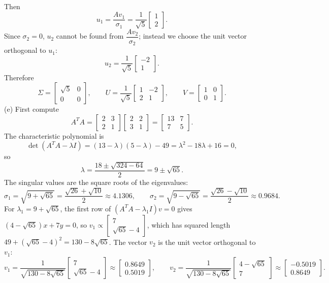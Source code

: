 \documentclass[11pt]{article}
\begin{document}
Then
$$
u_1 = \dfrac{Av_1}{\sigma_1} = \dfrac{1}{\sqrt{5}}\begin{bmatrix} 1 \\ 2 \end{bmatrix}.
$$
Since $\sigma_2 = 0$, $u_2$ cannot be found from $\dfrac{Av_2}{\sigma_2}$; instead we choose
the unit vector orthogonal to $u_1$:
$$
u_2 = \dfrac{1}{\sqrt{5}}\begin{bmatrix} -2 \\ 1 \end{bmatrix}.
$$
Therefore
$$
\Sigma = \begin{bmatrix} \sqrt{5} & 0 \\ 0 & 0 \end{bmatrix}, \qquad
U = \dfrac{1}{\sqrt{5}}\begin{bmatrix} 1 & -2 \\ 2 & 1 \end{bmatrix}, \qquad
V = \begin{bmatrix} 1 & 0 \\ 0 & 1 \end{bmatrix}.
$$
\bigskip
(e)
First compute
$$
A^TA = \begin{bmatrix} 2 & 3 \\ 2 & 1 \end{bmatrix}
\begin{bmatrix} 2 & 2 \\ 3 & 1 \end{bmatrix}
= \begin{bmatrix} 13 & 7 \\ 7 & 5 \end{bmatrix}.
$$
The characteristic polynomial is
$$
\det(A^TA - \lambda I) = (13 - \lambda)(5 - \lambda) - 49 = \lambda^2 - 18\lambda + 16 = 0,
$$
so
$$
\lambda = \dfrac{18 \pm \sqrt{324 - 64}}{2} = 9 \pm \sqrt{65}.
$$
The singular values are the square roots of the eigenvalues:
$$
\sigma_1 = \sqrt{9 + \sqrt{65}} = \dfrac{\sqrt{26} + \sqrt{10}}{2} \approx 4.1306, \qquad
\sigma_2 = \sqrt{9 - \sqrt{65}} = \dfrac{\sqrt{26} - \sqrt{10}}{2} \approx 0.9684.
$$
For $\lambda_1 = 9 + \sqrt{65}$, the first row of $(A^TA - \lambda_1 I)v = 0$ gives
$(4 - \sqrt{65})x + 7y = 0$, so $v_1 \propto \begin{bmatrix} 7 \\ \sqrt{65} - 4 \end{bmatrix}$,
which has squared length $49 + (\sqrt{65} - 4)^2 = 130 - 8\sqrt{65}$. The vector $v_2$ is the
unit vector orthogonal to $v_1$:
$$
v_1 = \dfrac{1}{\sqrt{130 - 8\sqrt{65}}}\begin{bmatrix} 7 \\ \sqrt{65} - 4 \end{bmatrix}
\approx \begin{bmatrix} 0.8649 \\ 0.5019 \end{bmatrix}, \qquad
v_2 = \dfrac{1}{\sqrt{130 - 8\sqrt{65}}}\begin{bmatrix} 4 - \sqrt{65} \\ 7 \end{bmatrix}
\approx \begin{bmatrix} -0.5019 \\ 0.8649 \end{bmatrix}.
$$
\end{document}

